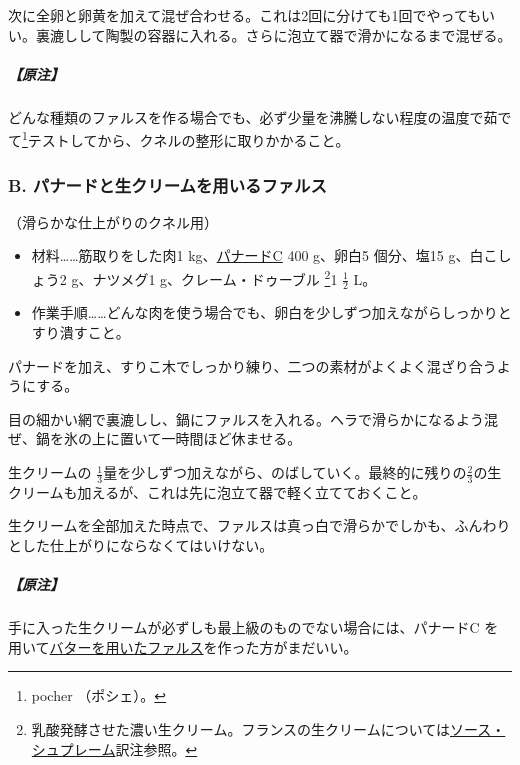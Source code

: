 \begin{recette}
次に全卵と卵黄を加えて混ぜ合わせる。これは2回に分けても1回でやってもいい。裏漉しして陶製の容器に入れる。さらに泡立て器で滑かになるまで混ぜる。

\hypertarget{nota-farce-a}{%
\subparagraph{【原注】}\label{nota-farce-a}}

どんな種類のファルスを作る場合でも、必ず少量を沸騰しない程度の温度で茹でて\footnote{pocher
  （ポシェ）。}テストしてから、クネルの整形に取りかかること。

\atoaki{}

\hypertarget{farce-b}{%
\subsubsection{B. パナードと生クリームを用いるファルス}\label{farce-b}}



（滑らかな仕上がりのクネル用）

\begin{itemize}
\item
  材料\ldots{}\ldots{}筋取りをした肉1
  kg、\protect\hyperlink{panade-c}{パナードC} 400 g、卵白5 個分、塩15
  g、白こしょう2 g、ナツメグ1 g、クレーム・ドゥーブル \footnote{乳酸発酵させた濃い生クリーム。フランスの生クリームについては\protect\hyperlink{sauce-supreme}{ソース・シュプレーム}訳注参照。}1
  \(\frac{1}{2}\) L。
\item
  作業手順\ldots{}\ldots{}どんな肉を使う場合でも、卵白を少しずつ加えながらしっかりとすり潰すこと。
\end{itemize}

パナードを加え、すりこ木でしっかり練り、二つの素材がよくよく混ざり合うようにする。

目の細かい網で裏漉しし、鍋にファルスを入れる。ヘラで滑らかになるよう混ぜ、鍋を氷の上に置いて一時間ほど休ませる。

生クリームの
\(\frac{1}{3}\)量を少しずつ加えながら、のばしていく。最終的に残りの\(\frac{2}{3}\)の生クリームも加えるが、これは先に泡立て器で軽く立てておくこと。

生クリームを全部加えた時点で、ファルスは真っ白で滑らかでしかも、ふんわりとした仕上がりにならなくてはいけない。

\hypertarget{nota-farce-b}{%
\subparagraph{【原注】}\label{nota-farce-b}}

手に入った生クリームが必ずしも最上級のものでない場合には、パナードC
を用いて\protect\hyperlink{farce-a}{バターを用いたファルス}を作った方がまだいい。


\end{recette}
